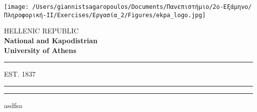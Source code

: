 \documentclass[a4paper,11pt]{article}
\begin{document}
\begin{center}
	\begin{minipage}{0.1\textwidth}
				\texttt{[image: /Users/giannistsagaropoulos/Documents/Πανεπιστήμιο/2ο-Εξάμηνο/Πληροφορική-ΙΙ/Exercises/Εργασία\_2/Figures/ekpa\_logo.jpg]}
			\end{minipage}
			\begin{minipage}{0.40\textwidth}
				\centering
				\footnotesize{\textrm{HELLENIC REPUBLIC}}\\
				\scriptsize{\textbf{\textrm{National and Kapodistrian}\\\textrm{University of Athens}}}\\
				\vspace{1.5mm}
				{\color{babyblue} 
				\rule[0.7mm]{8.5mm}{0.17mm} \tiny{\textrm{EST. 1837 }}\rule[0.7mm]{9.5mm}{0.17mm}
				}%
			\end{minipage}

\end{center}

{\color{babyblue} \rule[0cm]{5mm}{0.2mm} asdfsa}
\end{document}
